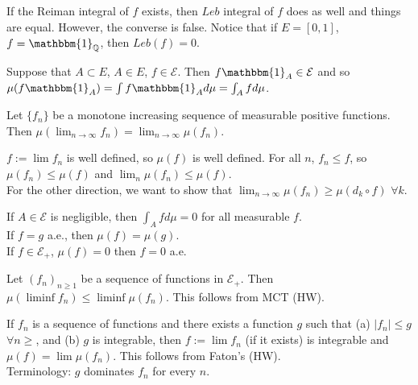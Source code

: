 \documentclass[12pt, titlepage]{article}
\begin{document}
\begin{theo}[]{}
If the Reiman integral of $f$ exists, then $Leb$ integral of $f$ does as well and things are equal. However, the converse is false. Notice that if $E = [0, 1]$, $f = \mathbbm{1}_\Q$, then $Leb(f) = 0$.\\
\end{theo}

Suppose that $A \subset E$, $A \in E$, $f \in \mathcal{E}$. Then $f \mathbbm{1}_A \in \mathcal{E}$ and so $\mu(f \mathbbm{1}_A) = \int f \mathbbm{1}_A d\mu = \int_A f d\mu$.

\begin{theo}[]{}
	Let $\{f_n\}$ be a monotone increasing sequence of measurable positive functions. Then $\mu(\lim_{n \to \infty} f_n) = \lim_{n \to \infty} \mu(f_n)$.
\end{theo}

\begin{prf}[]{}
	$f := \lim f_n$ is well defined, so $\mu(f)$ is well defined. For all $n$, $f_n \leq f$, so $\mu(f_n) \leq \mu(f)$ and $\lim_n \mu(f_n) \leq \mu(f)$.\\
	
	For the other direction, we want to show that $\lim_{n \to \infty} \mu(f_n) \geq \mu(d_k \circ f)$ $\forall k$.\\
\end{prf}

\begin{lem}[]{}
	If $A \in \mathcal{E}$ is negligible, then $\int_A f d\mu = 0$ for all measurable $f$.\\
	
	If $f = g$ a.e., then $\mu(f) = \mu(g)$.\\
	
	If $f \in \mathcal{E}_+$, $\mu(f) = 0$ then $f = 0$ a.e.
\end{lem}

\begin{theo}{}
	Let $(f_n)_{n \geq 1}$ be a sequence of functions in $\mathcal{E}_+$. Then $\mu(\liminf f_n) \leq \liminf \mu(f_n)$. This follows from MCT (HW).
\end{theo}

\begin{theo}
	If $f_n$ is a sequence of functions and there exists a function $g$ such that (a) $|f_n| \leq g$ $\forall n \geq $, and (b) $g$ is integrable, then $f:= \lim f_n$ (if it exists) is integrable and $\mu(f) = \lim \mu(f_n)$. This follows from Faton's (HW).\\
	
	Terminology: $g$ dominates $f_n$ for every $n$.
\end{theo}
\end{document}
